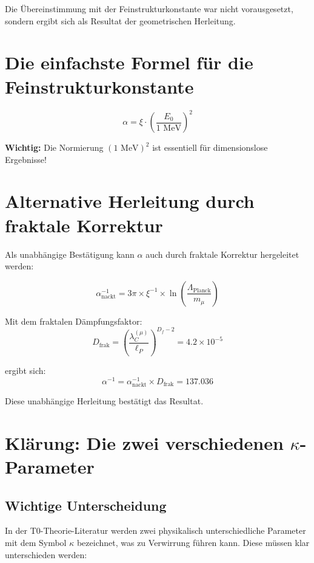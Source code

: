 	Die Übereinstimmung mit der Feinstrukturkonstante war nicht vorausgesetzt, sondern ergibt sich als Resultat der geometrischen Herleitung.
	\section*{Die einfachste Formel für die Feinstrukturkonstante}

\[
\boxed{\alpha = \xi \cdot \left(\frac{E_0}{1 \text{ MeV}}\right)^2}
\]
\begin{tcolorbox}[colback=red!5!white,colframe=red!75!black]
	\textbf{Wichtig:} Die Normierung $(1 \text{ MeV})^2$ ist essentiell für dimensionslose Ergebnisse!
\end{tcolorbox}	
	\section{Alternative Herleitung durch fraktale Korrektur}
	
	Als unabhängige Bestätigung kann $\alpha$ auch durch fraktale Korrektur hergeleitet werden:
	
	\begin{equation}
		\alpha_{\text{nackt}}^{-1} = 3\pi \times \xi^{-1} \times \ln\left(\frac{\Lambda_{\text{Planck}}}{m_\mu}\right)
	\end{equation}
	
	Mit dem fraktalen Dämpfungsfaktor:
	\begin{equation}
		D_{\text{frak}} = \left(\frac{\lambda_C^{(\mu)}}{\ell_P}\right)^{D_f-2} = 4.2 \times 10^{-5}
	\end{equation}
	
	ergibt sich:
	\begin{equation}
		\alpha^{-1} = \alpha_{\text{nackt}}^{-1} \times D_{\text{frak}} = 137.036
	\end{equation}
	
	Diese unabhängige Herleitung bestätigt das Resultat.
	
	\section{Klärung: Die zwei verschiedenen $\kappa$-Parameter}
	
	\subsection{Wichtige Unterscheidung}
	
	In der T0-Theorie-Literatur werden zwei physikalisch unterschiedliche Parameter mit dem Symbol $\kappa$ bezeichnet, was zu Verwirrung führen kann. Diese müssen klar unterschieden werden:
	
